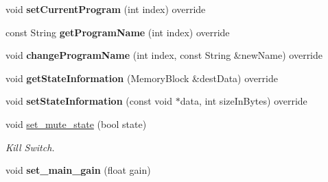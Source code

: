 \begin{DoxyCompactItemize}
\item 
void {\bfseries set\+Current\+Program} (int index) override\hypertarget{class_synth_audio_processor_a4b6cd6971957f8639959678393aa6fc9}{}\label{class_synth_audio_processor_a4b6cd6971957f8639959678393aa6fc9}

\item 
const String {\bfseries get\+Program\+Name} (int index) override\hypertarget{class_synth_audio_processor_a0f08ce1fe76ebc26b000ce4497302a78}{}\label{class_synth_audio_processor_a0f08ce1fe76ebc26b000ce4497302a78}

\item 
void {\bfseries change\+Program\+Name} (int index, const String \&new\+Name) override\hypertarget{class_synth_audio_processor_a40b1f109271c2fca6e63797389b47c0f}{}\label{class_synth_audio_processor_a40b1f109271c2fca6e63797389b47c0f}

\item 
void {\bfseries get\+State\+Information} (Memory\+Block \&dest\+Data) override\hypertarget{class_synth_audio_processor_a8ba48307305f830a2a4eeb82daed3273}{}\label{class_synth_audio_processor_a8ba48307305f830a2a4eeb82daed3273}

\item 
void {\bfseries set\+State\+Information} (const void $\ast$data, int size\+In\+Bytes) override\hypertarget{class_synth_audio_processor_a6e9efeeab582e9c462363bd2bede3959}{}\label{class_synth_audio_processor_a6e9efeeab582e9c462363bd2bede3959}

\item 
void \hyperlink{class_synth_audio_processor_ae08d1ba97b3ef0d00480c6ba150378cc}{set\+\_\+mute\+\_\+state} (bool state)\hypertarget{class_synth_audio_processor_ae08d1ba97b3ef0d00480c6ba150378cc}{}\label{class_synth_audio_processor_ae08d1ba97b3ef0d00480c6ba150378cc}

\begin{DoxyCompactList}\small\item\em Kill Switch. \end{DoxyCompactList}\item 
void {\bfseries set\+\_\+main\+\_\+gain} (float gain)\hypertarget{class_synth_audio_processor_a2647b27220f8becb1ea1fdba681480af}{}\label{class_synth_audio_processor_a2647b27220f8becb1ea1fdba681480af}


\end{DoxyCompactItemize}
